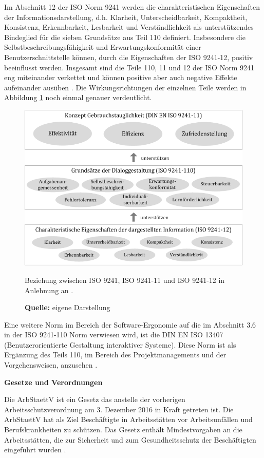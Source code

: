 Im Abschnitt 12 der ISO Norm 9241 werden die charakteristischen Eigenschaften der Informationsdarstellung, d.h. Klarheit, Unterscheidbarkeit, Kompaktheit, Konsistenz, Erkennbarkeit, Lesbarkeit und Verständlichkeit als unterstützendes Bindeglied für die sieben Grundsätze aus Teil 110 definiert. Insbesondere die Selbstbeschreibungsfähigkeit und Erwartungskonformität einer Benutzerschnittstelle können, durch die Eigenschaften der ISO 9241-12, positiv beeinflusst werden. Insgesamt sind die Teile 110, 11 und 12 der ISO Norm 9241 eng miteinander verkettet und können positive aber auch negative Effekte aufeinander ausüben \citep[vgl.][Kap. 6]{ISO9241-110}. Die Wirkungsrichtungen der einzelnen Teile werden in Abbildung \ref{fig:beziehungIsoNormen} noch einmal genauer verdeutlicht.
\begin{figure}[H]
  \centering
  \includegraphics[scale=0.86]{img/Beziehung_ISO9241_ISO9241-11_ISO9241-12.png}
  \caption{Beziehung zwischen ISO 9241, ISO 9241-11 und ISO 9241-12 in Anlehnung an \citep[]{ISO9241-110}.}
  \caption*{\textbf{Quelle:} eigene Darstellung}
  \label{fig:beziehungIsoNormen}
\end{figure}
Eine weitere Norm im Bereich der Software-Ergonomie auf die im Abschnitt 3.6 in der ISO 9241-110 Norm verwiesen wird, ist die DIN EN ISO 13407 (Benutzerorientierte Gestaltung interaktiver Systeme). Diese Norm ist als Ergänzung des Teils 110, im Bereich des Projektmanagements und der Vorgehensweisen, anzusehen \citep[vgl.][58]{schneider2008}.

\textbf{Gesetze und Verordnungen}

Die \gls{ArbStaettV} ist ein Gesetz das anstelle der vorherigen Arbeitsschutzverordnung am 3. Dezember 2016 in Kraft getreten ist. Die \gls{ArbStaettV} hat als Ziel Beschäftigte in Arbeitsstätten vor Arbeitsunfällen und Berufskrankheiten zu schützen. Das Gesetz enthält Mindestvorgaben an die Arbeitsstätten, die zur Sicherheit und zum Gesundheitsschutz der Beschäftigten eingeführt wurden \citep[vgl.][]{BAuA}. 

